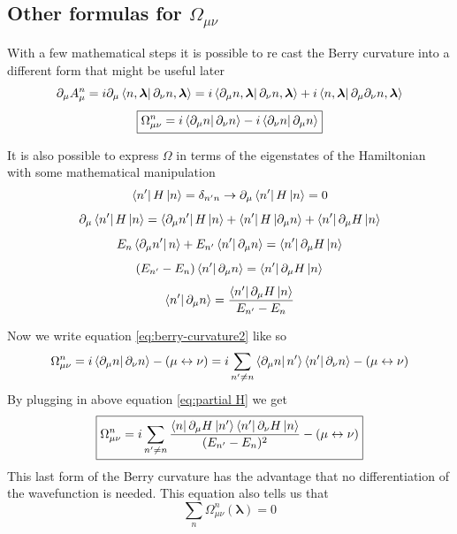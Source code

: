     \subsection{Other formulas for $\Omega_{\mu\nu}$}

        With a few mathematical steps it is possible to re cast the Berry curvature into a different form that might be useful later
        \[
            \partial_\mu A^n_\mu =i\partial_\mu \bra{n,\boldsymbol \lambda}\partial_\nu n,\boldsymbol \lambda \rangle= 
            i\bra{\partial_\mu n,\boldsymbol \lambda}\partial_\nu n,\boldsymbol \lambda \rangle + i\bra{n,\boldsymbol \lambda}\partial_\mu\partial_\nu n,\boldsymbol \lambda \rangle
        \]
        \begin{equation}
            \label{eq:berry-curvature2}
                \boxed{\Omega_{\mu\nu}^n =i\bra{\partial_\mu n}\partial_\nu n\rangle - i\bra{\partial_\nu n}\partial_\mu n\rangle}
        \end{equation}


        It is also possible to express $\Omega$ in terms of the eigenstates of the Hamiltonian with some mathematical manipulation
        \[
            \bra{n'} H \ket{n}=\delta_{n'n} \to \partial_\mu \bra{n'} H \ket{n}=0
        \]
        \[
        \partial_\mu \bra{n'} H \ket{n}=\bra{\partial_\mu n'}H\ket{n} + \bra{n'}H\ket{\partial_\mu n} + \bra{n'} \partial_\mu H\ket{n}
        \]
        \[
            E_{n}\bra{\partial_\mu n'}n\rangle + E_{n'} \bra{n'}\partial_\mu n\rangle=\bra{n'} \partial_\mu H\ket{n}
        \]
        \[
            (E_{n'}-E_n)\bra{n'} \partial_\mu n\rangle=\bra{n'} \partial_\mu H\ket{n}
        \]
        \begin{equation}
            \label{eq:partial H}
                \bra{n'}\partial_\mu n\rangle=  \frac{\bra{n'} \partial_\mu H\ket{n}}{E_{n'}-E_n}
        \end{equation}

        Now we write equation \ref{eq:berry-curvature2} like so
        \[
            \Omega_{\mu\nu}^n =i\bra{\partial_\mu n}\partial_\nu n\rangle - (\mu \leftrightarrow \nu)= i\sum_{n'\neq n}\bra{\partial_\mu n}n'\rangle\bra{n'}\partial_\nu n\rangle - (\mu \leftrightarrow \nu)
        \]
        By plugging in above equation \ref{eq:partial H} we get
        \begin{equation}
            \label{eq:berry-curvature3}
            \boxed{\Omega_{\mu\nu}^n=i\sum_{n'\neq n} \frac{\bra{n}\partial_\mu H\ket{n'}\bra{n'} \partial_\nu H\ket{n}}{(E_{n'}-E_n)^2}- (\mu \leftrightarrow \nu)}
        \end{equation}
        This last form of the Berry curvature has the advantage that no differentiation of the wavefunction is needed. This equation also tells us that
        \[ \sum_n \Omega_{\mu\nu}^n (\boldsymbol \lambda)=0 \]


